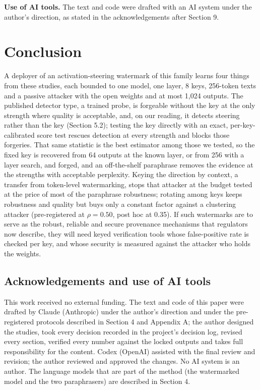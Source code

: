 \documentclass[11pt,letterpaper]{article}
\begin{document}
\textbf{Use of AI tools.} The text and code were drafted with an AI system under the author's direction, as stated in the acknowledgements after Section 9.

\hypertarget{conclusion}{%
\section{Conclusion}\label{conclusion}}

A deployer of an activation-steering watermark of this family learns four things from these studies, each bounded to one model, one layer, 8 keys, 256-token texts and a passive attacker with the open weights and at most 1,024 outputs. The published detector type, a trained probe, is forgeable without the key at the only strength where quality is acceptable, and, on our reading, it detects steering rather than the key (Section 5.2); testing the key directly with an exact, per-key-calibrated score test rescues detection at every strength and blocks those forgeries. That same statistic is the best estimator among those we tested, so the fixed key is recovered from 64 outputs at the known layer, or from 256 with a layer search, and forged, and an off-the-shelf paraphrase removes the evidence at the strengths with acceptable perplexity. Keying the direction by context, a transfer from token-level watermarking, stops that attacker at the budget tested at the price of most of the paraphrase robustness; rotating among keys keeps robustness and quality but buys only a constant factor against a clustering attacker (pre-registered at \(\rho = 0.50\), post hoc at 0.35). If such watermarks are to serve as the robust, reliable and secure provenance mechanisms that regulators now describe, they will need keyed verification tools whose false-positive rate is checked per key, and whose security is measured against the attacker who holds the weights.

\hypertarget{acknowledgements-and-use-of-ai-tools}{%
\subsection*{Acknowledgements and use of AI tools}\label{acknowledgements-and-use-of-ai-tools}}

This work received no external funding. The text and code of this paper were drafted by Claude (Anthropic) under the author's direction and under the pre-registered protocols described in Section 4 and Appendix A; the author designed the studies, took every decision recorded in the project's decision log, revised every section, verified every number against the locked outputs and takes full responsibility for the content. Codex (OpenAI) assisted with the final review and revision; the author reviewed and approved the changes. No AI system is an author. The language models that are part of the method (the watermarked model and the two paraphrasers) are described in Section 4.
\end{document}
